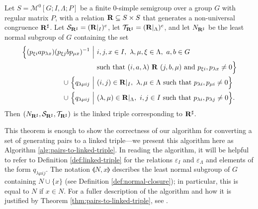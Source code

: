 \begin{theorem}
  \label{thm:pairs-to-linked-triple}
  Let $S = \mathcal{M}^0[G;I,\Lambda;P]$ be a finite 0-simple semigroup over a
  group $G$ with regular matrix $P$, with a relation $\mathbf{R} \subseteq S \times S$
  that generates a non-universal congruence $\mathbf{R}^\sharp$.  Let
  $\mathcal{S}_{\mathbf{R}^\sharp} = (\mathbf{R}|_I)^e$, let
  $\mathcal{T}_{\mathbf{R}^\sharp} = (\mathbf{R}|_\Lambda)^e$, and let $N_{\mathbf{R}^\sharp}$ be
  the least normal subgroup of $G$ containing the set
  \begin{align*}
    \Big\{(p_{\xi i} a p_{\lambda x}) (p_{\xi j} b p_{\mu x})^{-1} ~\Big|~
    & i,j,x \in I,\ \lambda, \mu, \xi \in \Lambda,\ a,b \in G \\
    & \text{such that~} (i,a,\lambda) ~\mathbf{R}~ (j,b,\mu) \text{~and~}
      p_{\xi i}, p_{\lambda x} \neq 0\Big\} \\
    \cup~ \Big\{q_{\lambda \mu i j} ~\Big|~ &
           (i,j) \in \mathbf{R}|_I,~
           \lambda,\mu \in \Lambda ~\textnormal{such that}~
           p_{\lambda i}, p_{\mu i} \neq 0\Big\} \\
    \cup~ \Big\{q_{\lambda \mu i j} ~\Big|~ &
           (\lambda,\mu) \in \mathbf{R}|_\Lambda,~
           i,j \in I ~\textnormal{such that}~
           p_{\lambda i}, p_{\lambda j} \neq 0\Big\}. \\
  \end{align*}
  Then $(N_{\mathbf{R}^\sharp}, \mathcal{S}_{\mathbf{R}^\sharp}, \mathcal{T}_{\mathbf{R}^\sharp})$
  is the linked triple corresponding to $\mathbf{R}^\sharp$.
\end{theorem}

This theorem is enough to show the correctness of our algorithm for converting a
set of generating pairs to a linked triple---we present this algorithm here as
Algorithm \ref{alg:pairs-to-linked-triple}.  In reading the algorithm, it will
be helpful to refer to Definition \ref{def:linked-triple} for the relations
$\varepsilon_I$ and $\varepsilon_\Lambda$ and elements of the form
$q_{\lambda \mu i j}$.  The notation $\llangle N, x \rrangle$ describes the
least normal subgroup of $G$ containing $N \cup \{x\}$ (see Definition
\ref{def:normal-closure}); in particular, this is equal to $N$ if $x \in N$.
For a fuller description of the algorithm and how it is justified by Theorem
\ref{thm:pairs-to-linked-triple}, see \cite[\S 3.2]{mtorpey_msc}.

